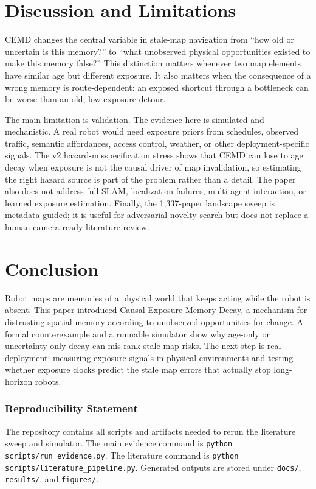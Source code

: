 \documentclass{article}
\begin{document}


\section{Discussion and Limitations}

CEMD changes the central variable in stale-map navigation from ``how old or uncertain is this memory?'' to ``what unobserved physical opportunities existed to make this memory false?'' This distinction matters whenever two map elements have similar age but different exposure. It also matters when the consequence of a wrong memory is route-dependent: an exposed shortcut through a bottleneck can be worse than an old, low-exposure detour.

The main limitation is validation. The evidence here is simulated and mechanistic. A real robot would need exposure priors from schedules, observed traffic, semantic affordances, access control, weather, or other deployment-specific signals. The v2 hazard-misspecification stress shows that CEMD can lose to age decay when exposure is not the causal driver of map invalidation, so estimating the right hazard source is part of the problem rather than a detail. The paper also does not address full SLAM, localization failures, multi-agent interaction, or learned exposure estimation. Finally, the 1,337-paper landscape sweep is metadata-guided; it is useful for adversarial novelty search but does not replace a human camera-ready literature review.

\section{Conclusion}

Robot maps are memories of a physical world that keeps acting while the robot is absent. This paper introduced Causal-Exposure Memory Decay, a mechanism for distrusting spatial memory according to unobserved opportunities for change. A formal counterexample and a runnable simulator show why age-only or uncertainty-only decay can mis-rank stale map risks. The next step is real deployment: measuring exposure signals in physical environments and testing whether exposure clocks predict the stale map errors that actually stop long-horizon robots.

\subsubsection*{Reproducibility Statement}
The repository contains all scripts and artifacts needed to rerun the literature sweep and simulator. The main evidence command is \texttt{python scripts/run\_evidence.py}. The literature command is \texttt{python scripts/literature\_pipeline.py}. Generated outputs are stored under \texttt{docs/}, \texttt{results/}, and \texttt{figures/}.
\end{document}
